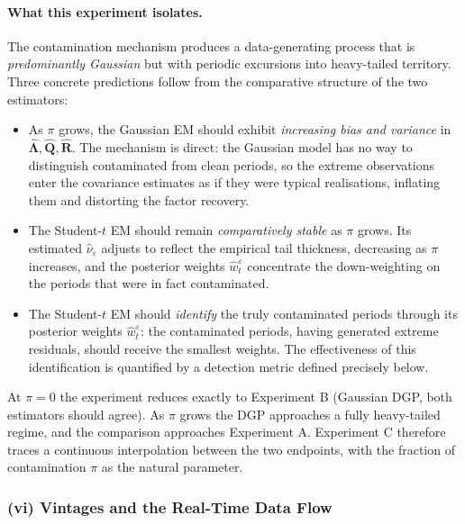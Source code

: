 \documentclass[11pt, a4paper, oneside]{article}
\newcommand{\mL}{\boldsymbol{\Lambda}}
\newcommand{\mR}{\mathbf{R}}
\begin{document}
\paragraph{What this experiment isolates.}
The contamination mechanism produces a data-generating process
that is \emph{predominantly Gaussian} but with periodic excursions
into heavy-tailed territory. Three concrete predictions follow
from the comparative structure of the two estimators:
\begin{itemize}[leftmargin=1.5em, itemsep=3pt]
    \item As $\pi$ grows, the Gaussian EM should exhibit
          \emph{increasing bias and variance} in
          $\hat{\mL}, \hat{\mathbf{Q}}, \hat{\mR}$. The mechanism
          is direct: the Gaussian model has no way to distinguish
          contaminated from clean periods, so the extreme
          observations enter the covariance estimates as if they
          were typical realisations, inflating them and distorting
          the factor recovery.
    \item The Student-$t$ EM should remain \emph{comparatively
          stable} as $\pi$ grows. Its estimated
          $\hat{\nu}_\varepsilon$ adjusts to reflect the empirical
          tail thickness, decreasing as $\pi$ increases, and the
          posterior weights $\hat{w}_t^\varepsilon$ concentrate
          the down-weighting on the periods that were in fact
          contaminated.
    \item The Student-$t$ EM should \emph{identify} the truly
          contaminated periods through its posterior weights
          $\hat{w}_t^\varepsilon$: the contaminated periods, having
          generated extreme residuals, should receive the smallest
          weights. The effectiveness of this identification is
          quantified by a detection metric defined precisely below.
\end{itemize}
At $\pi = 0$ the experiment reduces exactly to Experiment B
(Gaussian DGP, both estimators should agree). As $\pi$ grows the
DGP approaches a fully heavy-tailed regime, and the comparison
approaches Experiment A. Experiment C therefore traces a
continuous interpolation between the two endpoints, with the
fraction of contamination $\pi$ as the natural parameter.

\subsubsection*{(vi) Vintages and the Real-Time Data Flow}
\label{subsubsec:sim-vintages}
\end{document}
